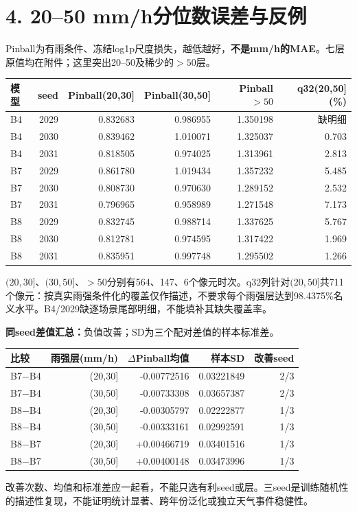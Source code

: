 \documentclass[UTF8,a4paper,10pt,fontset=none]{ctexart}
\begin{document}
\section*{4. 20--50 mm/h分位数误差与反例}
Pinball为有雨条件、冻结log1p尺度损失，越低越好，\textbf{不是mm/h的MAE}。七层原值均在附件；这里突出20--50及稀少的$>50$层。
\begin{center}
\footnotesize
\begin{tabular}{@{}lrrrrr@{}}
\toprule
模型 & seed & Pinball(20,30] & Pinball(30,50] & Pinball$>50$ & q32(20,50](\%) \\
\midrule
B4 & 2029 & 0.832683 & 0.986955 & 1.350198 & 缺明细 \\
B4 & 2030 & 0.839462 & 1.010071 & 1.325037 & 0.703 \\
B4 & 2031 & 0.818505 & 0.974025 & 1.313961 & 2.813 \\
B7 & 2029 & 0.861780 & 1.019434 & 1.357232 & 5.485 \\
B7 & 2030 & 0.808730 & 0.970630 & 1.289152 & 2.532 \\
B7 & 2031 & 0.796965 & 0.958989 & 1.271548 & 7.173 \\
B8 & 2029 & 0.832745 & 0.988714 & 1.337625 & 5.767 \\
B8 & 2030 & 0.812781 & 0.974595 & 1.317422 & 1.969 \\
B8 & 2031 & 0.835951 & 0.997748 & 1.295502 & 1.266 \\
\bottomrule
\end{tabular}
\end{center}
$(20,30]$、$(30,50]$、$>50$分别有564、147、6个像元时次。q32列针对$(20,50]$共711个像元：按真实雨强条件化的覆盖仅作描述，不要求每个雨强层达到98.4375\%名义水平。B4/2029缺逐场景尾部明细，不能填补其缺失覆盖率。

\textbf{同seed差值汇总：}负值改善；SD为三个配对差值的样本标准差。
\begin{center}
\small
\begin{tabular}{@{}lrrrr@{}}
\toprule
比较 & 雨强层(mm/h) & $\Delta$Pinball均值 & 样本SD & 改善seed \\
\midrule
B7$-$B4 & (20,30] & -0.00772516 & 0.03221849 & 2/3 \\
B7$-$B4 & (30,50] & -0.00733308 & 0.03657387 & 2/3 \\
B8$-$B4 & (20,30] & -0.00305797 & 0.02222877 & 1/3 \\
B8$-$B4 & (30,50] & -0.00333161 & 0.02992591 & 1/3 \\
B8$-$B7 & (20,30] & +0.00466719 & 0.03401516 & 1/3 \\
B8$-$B7 & (30,50] & +0.00400148 & 0.03473996 & 1/3 \\
\bottomrule
\end{tabular}
\end{center}
改善次数、均值和标准差应一起看，不能只选有利seed或层。三seed是训练随机性的描述性复现，不能证明统计显著、跨年份泛化或独立天气事件稳健性。
\end{document}

